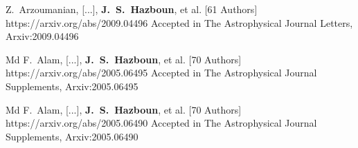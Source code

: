          {Z.~{Arzoumanian}, [...], \textbf{J.~S.~{Hazboun}}, et al. [61 Authors]}
         {https://arxiv.org/abs/2009.04496}
         {Accepted in {The Astrophysical Journal Letters}, {Arxiv:}2009.04496}

         {Md F.~{Alam}, [...], \textbf{J.~S.~{Hazboun}}, et al. [70 Authors]}
         {https://arxiv.org/abs/2005.06495}
         {Accepted in {The Astrophysical Journal Supplements}, {Arxiv:}2005.06495}

         {Md F.~{Alam}, [...], \textbf{J.~S.~{Hazboun}}, et al. [70 Authors]}
         {https://arxiv.org/abs/2005.06490}
         {Accepted in {The Astrophysical Journal Supplements}, {Arxiv:}2005.06490}

